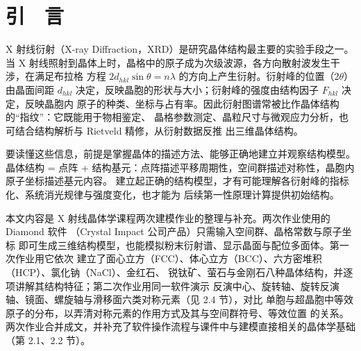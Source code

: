 \section{引　言}

X 射线衍射（X-ray Diffraction，XRD）是研究晶体结构最主要的实验手段之一\cite{liang1991xray}。
当 X 射线照射到晶体上时，晶格中的原子成为次级波源，各方向散射波发生干涉，在满足布拉格
方程 $2d_{hkl}\sin\theta=n\lambda$ 的方向上产生衍射。衍射峰的位置（$2\theta$）由晶面间距
$d_{hkl}$ 决定，反映晶胞的形状与大小；衍射峰的强度由结构因子 $F_{hkl}$ 决定，反映晶胞内
原子的种类、坐标与占有率。因此衍射图谱常被比作晶体结构的``指纹''：它既能用于物相鉴定、
晶格参数测定、晶粒尺寸与微观应力分析，也可结合结构解析与 Rietveld 精修，从衍射数据反推
出三维晶体结构。

要读懂这些信息，前提是掌握晶体的描述方法、能够正确地建立并观察结构模型。晶体结构 =
点阵 + 结构基元：点阵描述平移周期性，空间群描述对称性，晶胞内原子坐标描述基元内容。
建立起正确的结构模型，才有可能理解各衍射峰的指标化、系统消光规律与强度变化，也才能为
后续第一性原理计算提供初始结构\cite{huang1988solid}。

本文内容是 X 射线晶体学课程两次建模作业的整理与补充。两次作业使用的 Diamond 软件
（Crystal Impact 公司产品\cite{diamond2023manual}）只需输入空间群、晶格常数与原子坐标
即可生成三维结构模型，也能模拟粉末衍射谱、显示晶面与配位多面体。第一次作业用它依次
建立了面心立方（FCC）、体心立方（BCC）、六方密堆积（HCP）、氯化钠（NaCl）、金红石、
锐钛矿、萤石与金刚石八种晶体结构，并逐项讲解其结构特征；第二次作业用同一软件演示
反演中心、旋转轴、旋转反演轴、镜面、螺旋轴与滑移面六类对称元素（见 2.4 节），对比
单胞与超晶胞中等效原子的分布，以弄清对称元素的作用方式及其与空间群符号、等效位置
的关系。两次作业合并成文，并补充了软件操作流程与课件中与建模直接相关的晶体学基础
（第 2.1、2.2 节）。
